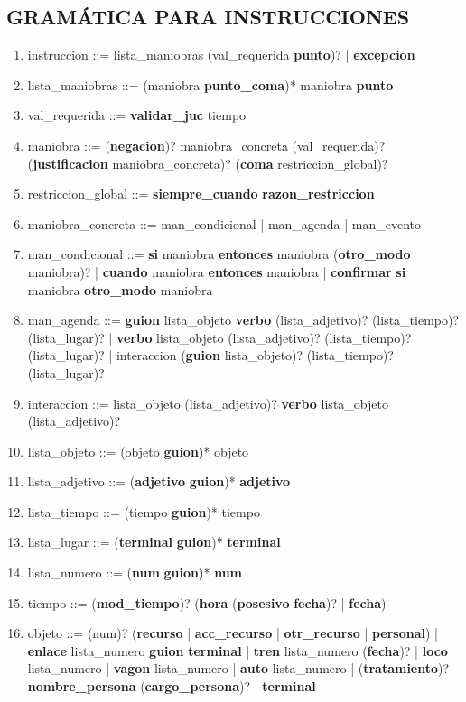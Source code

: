 \documentclass[oneside,12pt, letterpaper, titlepage]{book}
\begin{document}
\begin{appendices}
\chapter[Gramática para Instrucciones]{GRAMÁTICA PARA INSTRUCCIONES}
{
\begin{enumerate}
\item instruccion ::= lista\_maniobras (val\_requerida \textbf{punto})? | \textbf{excepcion}
\item lista\_maniobras ::= (maniobra \textbf{punto\_coma})* maniobra \textbf{punto}
\item val\_requerida ::= \textbf{validar\_juc} tiempo
\item maniobra ::= (\textbf{negacion})? maniobra\_concreta (val\_requerida)? (\textbf{justificacion} maniobra\_concreta)? (\textbf{coma} restriccion\_global)? 
\item restriccion\_global ::=  \textbf{siempre\_cuando} \textbf{razon\_restriccion}
\item maniobra\_concreta ::=  man\_condicional | man\_agenda | man\_evento
\item man\_condicional ::= \textbf{si} maniobra \textbf{entonces} maniobra (\textbf{otro\_modo} maniobra)? | \textbf{cuando} maniobra \textbf{entonces} maniobra | \textbf{confirmar} \textbf{si} maniobra \textbf{otro\_modo} maniobra
\item man\_agenda ::= \textbf{guion} lista\_objeto \textbf{verbo} (lista\_adjetivo)? (lista\_tiempo)? (lista\_lugar)? | \textbf{verbo} lista\_objeto (lista\_adjetivo)? (lista\_tiempo)? (lista\_lugar)? | interaccion (\textbf{guion} lista\_objeto)? (lista\_tiempo)? (lista\_lugar)?
\item interaccion ::= lista\_objeto (lista\_adjetivo)? \textbf{verbo} lista\_objeto (lista\_adjetivo)? 
\item lista\_objeto ::= (objeto \textbf{guion})* objeto
\item lista\_adjetivo ::= (\textbf{adjetivo} \textbf{guion})* \textbf{adjetivo}
\item lista\_tiempo ::= (tiempo \textbf{guion})* tiempo
\item lista\_lugar ::= (\textbf{terminal} \textbf{guion})* \textbf{terminal}
\item lista\_numero ::= (\textbf{num} \textbf{guion})* \textbf{num}
\item tiempo ::= (\textbf{mod\_tiempo})? (\textbf{hora} (\textbf{posesivo} \textbf{fecha})? | \textbf{fecha}) 
\item objeto ::= (num)? (\textbf{recurso} | \textbf{acc\_recurso} | \textbf{otr\_recurso} | \textbf{personal}) | \textbf{enlace} lista\_numero \textbf{guion} \textbf{terminal} | \textbf{tren} lista\_numero (\textbf{fecha})? | \textbf{loco} lista\_numero | \textbf{vagon} lista\_numero | \textbf{auto} lista\_numero | (\textbf{tratamiento})? \textbf{nombre\_persona} (\textbf{cargo\_persona})? | \textbf{terminal}

\end{enumerate}}
\end{appendices}
\end{document}
